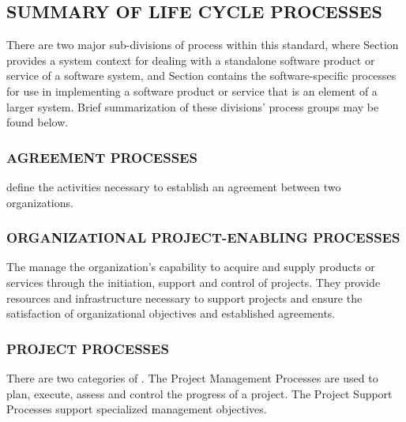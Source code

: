 	\subsection{SUMMARY OF LIFE CYCLE PROCESSES}
	\begin{adjustwidth}{0.5em}{0pt}

		There are two major sub-divisions of process within this standard, where Section  provides a system context for dealing with a standalone software product or service of a software system, and Section  contains the software-specific processes for use in implementing a software product or service that is an element of a larger system. Brief summarization of these divisions' process groups may be found below.

	\end{adjustwidth}

		\subsubsection{AGREEMENT PROCESSES}
		\begin{adjustwidth}{1em}{0pt}

			 define the activities necessary to establish an agreement between two organizations. 

		\end{adjustwidth}

		\subsubsection{ORGANIZATIONAL PROJECT-ENABLING PROCESSES}
		\begin{adjustwidth}{1em}{0pt}

			The  manage the organization's capability to acquire and supply products or services through the initiation, support and control of projects. They provide resources and infrastructure necessary to support projects and ensure the satisfaction of organizational objectives and established agreements.

		\end{adjustwidth}

		\subsubsection{PROJECT PROCESSES}
		\begin{adjustwidth}{1em}{0pt}

			There are two categories of . The Project Management Processes are used to plan, execute, assess and control the progress of a project. The Project Support Processes support specialized management objectives.

		\end{adjustwidth}


